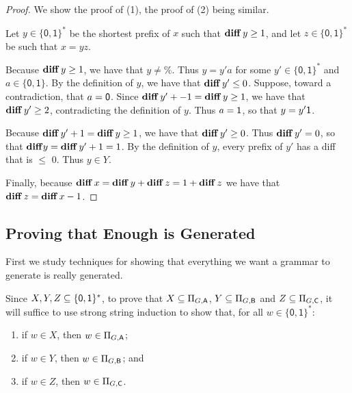 \begin{proof}
We show the proof of (1), the proof of (2) being similar.

Let $y\in\{\mathsf{0,1}\}^*$ be the shortest prefix of $x$ such
that $\mathbf{diff}\,y\geq 1$, and let $z\in\{\mathsf{0,1}\}^*$ be such
that $x=yz$.

Because $\mathbf{diff}\,y\geq 1$, we have that $y\neq\%$.  Thus $y=y'a$
for some $y'\in\{\mathsf{0,1}\}^*$ and $a\in\{\mathsf{0,1}\}$.
By the definition of $y$, we have that $\mathbf{diff}\,y'\leq 0$.
Suppose, toward a contradiction, that $a=\mathsf{0}$.  Since
$\mathbf{diff}\,y' + -1=\mathbf{diff}\,y\geq 1$, we have that $\mathbf{diff}\,y'\geq 2$,
contradicting the definition of $y$.  Thus $a=\mathsf{1}$, so
that $y=y'\mathsf{1}$.

Because $\mathbf{diff}\,y' + 1 = \mathbf{diff}\,y\geq 1$, we have that $\mathbf{diff}\,y'\geq
0$.  Thus $\mathbf{diff}\,y' = 0$, so that $\mathbf{diff} y = \mathbf{diff}\,y' + 1 = 1$.  By
the definition of $y$, every prefix of $y'$ has a diff that is
$\leq$ $0$.  Thus $y\in Y$.

Finally, because $\mathbf{diff}\,x = \mathbf{diff}\,y + \mathbf{diff}\,z = 1 + \mathbf{diff}\,z$ we have
that $\mathbf{diff}\,z = \mathbf{diff}\,x - 1$.
\end{proof}

\subsection{Proving that Enough is Generated}

First we study techniques for showing that everything we want a
grammar to generate is really generated.

Since $X,Y,Z\subseteq\{\mathsf{0,1}\}^*$, to prove that
$X\subseteq\Pi_{G,\mathsf{A}}$, $Y\subseteq\Pi_{G,\mathsf{B}}$ and $Z\subseteq\Pi_{G,\mathsf{C}}$, it
will suffice to use strong string induction to show that, for all
$w\in\mathsf{\{0,1\}^*}$:

\begin{enumerate}[\quad(A)]
\item if $w\in X$, then $w\in\Pi_{G,\mathsf{A}}$;

\item if $w\in Y$, then $w\in\Pi_{G,\mathsf{B}}$; and

\item if $w\in Z$, then $w\in\Pi_{G,\mathsf{C}}$.
\end{enumerate}

